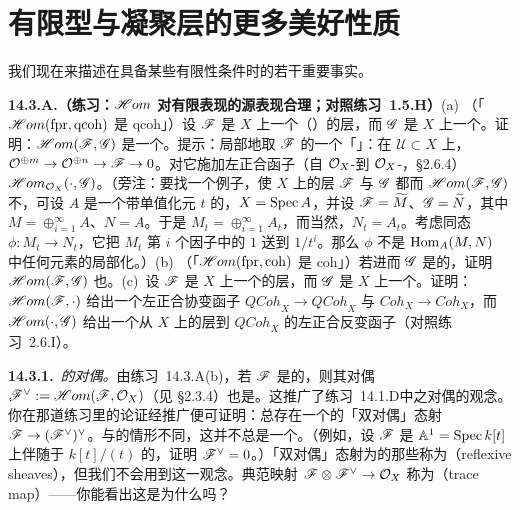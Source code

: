 
\section{有限型与凝聚层的更多美好性质}

我们现在来描述\trQCSheaf{}在具备某些有限性条件时的若干重要事实。

\textbf{14.3.A.（练习：$\mathscr{H}om$ 对有限表现的源表现合理；对照\mbox{练习~1.5.H}）}\quad (a) （「$\mathscr{H}om(\mathrm{fpr},\mathrm{qcoh})$ 是 $\mathrm{qcoh}$」）设 $\mathscr{F}$ 是 $X$ 上一个\trFinitelyPresented{}（\trQC）的层，而 $\mathscr{G}$ 是 $X$ 上一个\trQCSheaf。证明：$\mathscr{H}om(\mathscr{F},\mathscr{G})$ 是一个\trQCSheaf。提示：局部地取 $\mathscr{F}$ 的一个「\trFinitelyPresented」：在 $\mathscr{U}\subset X$ 上，$\mathcal{O}^{\oplus m}\to\mathcal{O}^{\oplus n}\to\mathscr{F}\to 0$。对它施加左正合函子（自 $\mathcal{O}_X$-\trModule{}到 $\mathcal{O}_X$-\trModule{}，\S2.6.4）$\mathscr{H}om_{\mathcal{O}_X}(\cdot,\mathscr{G})$。（旁注：要找一个例子，使\trScheme{} $X$ 上的层 $\mathscr{F}$ 与 $\mathscr{G}$ 都\trQC{}而 $\mathscr{H}om(\mathscr{F},\mathscr{G})$ 不\trQC，可设 $A$ 是一个带单值化元 $t$ 的\trDVR，$X=\operatorname{Spec} A$，并设 $\mathscr{F}=\widetilde{M}$、$\mathscr{G}=\widetilde{N}$，其中 $M=\oplus_{i=1}^{\infty}A$、$N=A$。于是 $M_t=\oplus_{i=1}^{\infty}A_t$，而当然，$N_t=A_t$。考虑同态 $\phi\colon M_t\to N_t$，它把 $M_t$ 第 $i$ 个因子中的 $1$ 送到 $1/t^{i}$。那么 $\phi$ 不是 $\operatorname{Hom}_A(M,N)$ 中任何元素的局部化。）(b) （「$\mathscr{H}om(\mathrm{fpr},\mathrm{coh})$ 是 $\mathrm{coh}$」）若进而 $\mathscr{G}$ 是\trCoh{}的，证明 $\mathscr{H}om(\mathscr{F},\mathscr{G})$ 也\trCoh。(c)~设 $\mathscr{F}$ 是 $X$ 上一个\trFinitelyPresented{}的层，而 $\mathscr{G}$ 是 $X$ 上一个\trQCSheaf。证明：$\mathscr{H}om(\mathscr{F},\cdot)$ 给出一个左正合协变函子 $\mathit{QCoh}_X\to\mathit{QCoh}_X$ 与 $\mathit{Coh}_X\to\mathit{Coh}_X$，而 $\mathscr{H}om(\cdot,\mathscr{G})$ 给出一个从 $X$ 上\trFinitelyPresented{}的层到 $\mathit{QCoh}_X$ 的左正合反变函子（对照\mbox{练习~2.6.I}）。

\textbf{14.3.1.}\ \emph{\trCoherentSheaf{}的对偶。}\quad 由\mbox{练习~14.3.A(b)}，若 $\mathscr{F}$ 是\trCoh{}的，则其对偶 $\mathscr{F}^{\vee}:=\mathscr{H}om(\mathscr{F},\mathcal{O}_X)$（见 \S2.3.4）也是。这推广了\mbox{练习~14.1.D}中\trVectorBundle{}之对偶的观念。你在那道练习里的论证经推广便可证明：总存在一个\trNatural{}的「双对偶」态射 $\mathscr{F}\to(\mathscr{F}^{\vee})^{\vee}$。与\trVectorBundle{}的情形不同，这并不总是一个\trIsomorphism。（例如，设 $\mathscr{F}$ 是 $\mathbb{A}^1=\operatorname{Spec} k[t]$ 上伴随于 $k[t]/(t)$ 的\trCoherentSheaf，证明 $\mathscr{F}^{\vee}=0$。）「双对偶」态射为\trIsomorphism{}的那些\trCoherentSheaf{}称为\textbf{\trReflexiveSheaf}（reflexive sheaves），但我们不会用到这一观念。典范映射 $\mathscr{F}\otimes\mathscr{F}^{\vee}\to\mathcal{O}_X$ 称为\emph{\trTraceMap}（trace map）——你能看出这是为什么吗？

